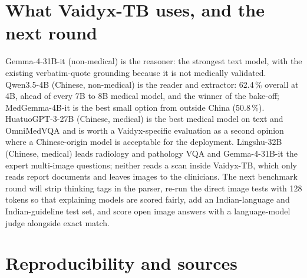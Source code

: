 \documentclass{article}
\newcommand{\pct}{\,\%}
\begin{document}
\section{What Vaidyx-TB uses, and the next round}

Gemma-4-31B-it (non-medical) is the reasoner: the strongest text model, with the existing verbatim-quote grounding because it is not medically validated. Qwen3.5-4B (Chinese, non-medical) is the reader and extractor: 62.4\pct{} overall at 4B, ahead of every 7B to 8B medical model, and the winner of the bake-off; MedGemma-4B-it is the best small option from outside China (50.8\pct{}). HuatuoGPT-3-27B (Chinese, medical) is the best medical model on text and OmniMedVQA and is worth a Vaidyx-specific evaluation as a second opinion where a Chinese-origin model is acceptable for the deployment. Lingshu-32B (Chinese, medical) leads radiology and pathology VQA and Gemma-4-31B-it the expert multi-image questions; neither reads a scan inside Vaidyx-TB, which only reads report documents and leaves images to the clinicians. The next benchmark round will strip thinking tags in the parser, re-run the direct image tests with 128 tokens so that explaining models are scored fairly, add an Indian-language and Indian-guideline test set, and score open image answers with a language-model judge alongside exact match.

\section{Reproducibility and sources}
\label{sec:sources}
\end{document}
